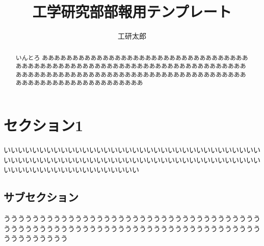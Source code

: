 \documentclass[dvipdfmx,a4j,twocolumn,10pt,uplatex]{jsarticle}
\title{工学研究部部報用テンプレート}
\date{}
\author{工研太郎}
\begin{document}
\begin{abstract}
  \vspace*{-2em}
  \centering
  いんとろ
  あああああああああああああああああああああああああああああああああああああああああああああああああああああああああああああああああああああああああああああああああああああああああああああああああああああああああああああああああああああああああああああああああああ
\end{abstract}

\maketitle
\pagestyle{fancy}

\section{セクション1}
いいいいいいいいいいいいいいいいいいいいいいいいいいいいいいいいいいいいいいいいいいいいいいいいいいいいいいいいいいいいいいいいいいいいいいいいいいいいいいいいいいいいいいいいいいい

\subsection{サブセクション}
ううううううううううううううううううううううううううううううううううううううううううううううううううううううううううううううううううううううううううううううううう
\end{document}
